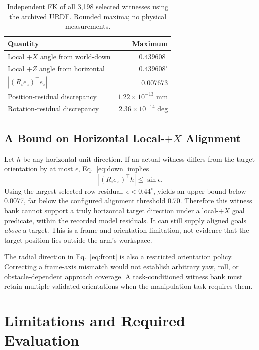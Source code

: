 \documentclass[letterpaper,10pt,conference]{ieeeconf}
\begin{document}
\begin{table}[t]
\centering\caption{Independent FK of all 3,198 selected witnesses using the archived URDF. Rounded maxima; no physical measurements.}
\label{tab:frames}
\small\begin{tabular}{@{}lr@{}}\toprule
Quantity & Maximum \\\midrule
Local $+X$ angle from world-down & $0.439608^\circ$ \\
Local $+Z$ angle from horizontal & $0.439608^\circ$ \\
$|(R_i e_z)^\top e_z|$ & 0.007673 \\
Position-residual discrepancy & $1.22\!\times\!10^{-13}$ mm \\
Rotation-residual discrepancy & $2.36\!\times\!10^{-14}$ deg \\\bottomrule
\end{tabular}
\end{table}

\subsection{A Bound on Horizontal Local-$+X$ Alignment}
Let $h$ be any horizontal unit direction. If an actual witness differs from the target orientation by at most $\epsilon$, Eq.~\eqref{eq:down} implies
\begin{equation}
 |(R_i e_x)^\top h|\le\sin\epsilon.
 \label{eq:bound}
\end{equation}
Using the largest selected-row residual, $\epsilon<0.44^\circ$, yields an upper bound below 0.0077, far below the configured alignment threshold 0.70. Therefore this witness bank cannot support a truly horizontal target direction under a local-$+X$ goal predicate, within the recorded model residuals. It can still supply aligned goals \emph{above} a target. This is a frame-and-orientation limitation, not evidence that the target position lies outside the arm's workspace.

The radial direction in Eq.~\eqref{eq:front} is also a restricted orientation policy. Correcting a frame-axis mismatch would not establish arbitrary yaw, roll, or obstacle-dependent approach coverage. A task-conditioned witness bank must retain multiple validated orientations when the manipulation task requires them.

\section{Limitations and Required Evaluation}
\end{document}
